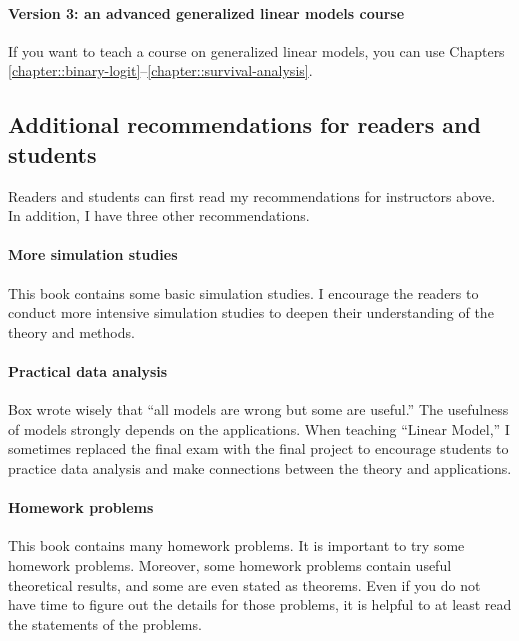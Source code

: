 \paragraph*{Version 3: an advanced generalized linear models course} 
If you want to teach a course on generalized linear models, you can use Chapters \ref{chapter::binary-logit}--\ref{chapter::survival-analysis}. 







\subsection*{Additional recommendations for readers and students}



Readers and students can first read my recommendations for instructors above.  In addition, I have three other recommendations. 


\paragraph*{More simulation studies}
This book contains some basic simulation studies. I encourage the readers to conduct more intensive simulation studies to deepen their understanding of the theory and methods. 


\paragraph*{Practical data analysis}
Box wrote wisely that ``all models are wrong but some are useful.'' The usefulness of models strongly depends on the applications. When teaching ``Linear Model,'' I sometimes replaced the final exam with the final project to encourage students to practice data analysis and make connections between the theory and applications.


\paragraph*{Homework problems}
This book contains many homework problems. It is important to try some homework problems. Moreover, some homework problems contain useful theoretical results, and some are even stated as theorems. Even if you do not have time to figure out the details for those problems,  it is helpful to at least read the statements of the problems.  



